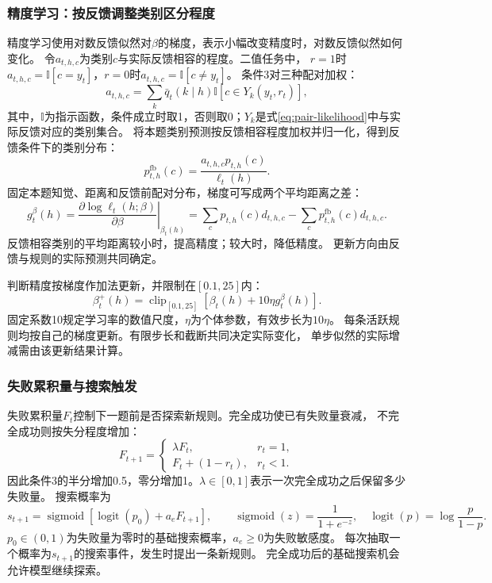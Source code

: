 \documentclass[11pt,a4paper]{article}
\numberwithin{equation}{section}
\newcommand{\ind}{\mathbb{I}}
\newcommand{\clip}{\operatorname{clip}}
\newcommand{\logit}{\operatorname{logit}}
\newcommand{\sigmoid}{\operatorname{sigmoid}}
\begin{document}
\subsubsection{精度学习：按反馈调整类别区分程度}
\label{sec:precision}
精度学习使用对数反馈似然对$\beta$的梯度，表示小幅改变精度时，对数反馈似然如何变化。
令$a_{t,h,c}$为类别$c$与实际反馈相容的程度。二值任务中，
$r=1$时$a_{t,h,c}=\ind[c=y_t]$，$r=0$时$a_{t,h,c}=\ind[c\ne y_t]$。
条件3对三种配对加权：
\begin{equation}
a_{t,h,c}=\sum_k\bar q_t(k\mid h)\ind[c\in Y_k(y_t,r_t)],
\end{equation}
其中，$\ind$为指示函数，条件成立时取1，否则取0；$Y_k$是式\eqref{eq:pair-likelihood}中与实际反馈对应的类别集合。
将本题类别预测按反馈相容程度加权并归一化，得到反馈条件下的类别分布：
\begin{equation}
p_{t,h}^{\mathrm{fb}}(c)=\frac{a_{t,h,c}p_{t,h}(c)}{\ell_t(h)}.
\end{equation}
固定本题知觉、距离和反馈前配对分布，梯度可写成两个平均距离之差：
\begin{equation}
g_t^\beta(h)=\left.\frac{\partial\log\ell_t(h;\beta)}{\partial\beta}\right|_{\beta_t(h)}
=\sum_c p_{t,h}(c)d_{t,h,c}-\sum_c p_{t,h}^{\mathrm{fb}}(c)d_{t,h,c}.
\label{eq:gradient}
\end{equation}
反馈相容类别的平均距离较小时，提高精度；较大时，降低精度。
更新方向由反馈与规则的实际预测共同确定。

判断精度按梯度作加法更新，并限制在$[0.1,25]$内：
\begin{equation}
\beta_t^+(h)=\clip_{[0.1,25]}\left[\beta_t(h)+10\eta g_t^\beta(h)\right].
\label{eq:beta}
\end{equation}
固定系数10规定学习率的数值尺度，$\eta$为个体参数，有效步长为$10\eta$。
每条活跃规则均按自己的梯度更新。有限步长和截断共同决定实际变化，
单步似然的实际增减需由该更新结果计算。

\subsubsection{失败累积量与搜索触发}
失败累积量$F_t$控制下一题前是否探索新规则。完全成功使已有失败量衰减，
不完全成功则按失分程度增加：
\begin{equation}
F_{t+1}=\begin{cases}\lambda F_t,&r_t=1,\\F_t+(1-r_t),&r_t<1.\end{cases}
\label{eq:failure}
\end{equation}
因此条件3的半分增加0.5，零分增加1。$\lambda\in[0,1]$表示一次完全成功之后保留多少失败量。
搜索概率为
\begin{equation}
s_{t+1}=\sigmoid\!\left[\logit(p_0)+a_eF_{t+1}\right],\qquad
\sigmoid(z)=\frac1{1+e^{-z}},\quad\logit(p)=\log\frac{p}{1-p}.
\label{eq:search}
\end{equation}
$p_0\in(0,1)$为失败量为零时的基础搜索概率，$a_e\geq0$为失败敏感度。
每次抽取一个概率为$s_{t+1}$的搜索事件，发生时提出一条新规则。
完全成功后的基础搜索机会允许模型继续探索。
\end{document}
